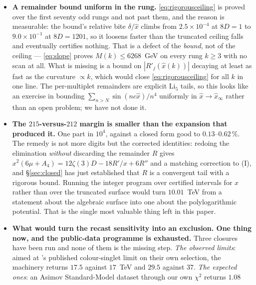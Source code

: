 \documentclass[11pt,a4paper]{article}
\newcommand{\amin}{\alpha_{\min}}
\begin{document}
\begin{itemize}
question: across $6560$ contents the $2956$ interior minimisers stand only $1.05$ times closer to
the rational skeleton $\{1/3,1/2,2/3\}$ than chance does. The $y$ at which a given content's third
minimum sits still ought to be readable off its charges the way $\amin$ is, and is not --- and the
nearest rational holonomy is now known not to be the way to read it.
\item \textbf{A remainder bound uniform in the rung.} \eqref{eq:rigorousceiling} is proved over the
first seventy odd rungs and not past them, and the reason is measurable: the bound's relative bite
$\delta/\hat x$ climbs from $2.5\times10^{-4}$ at $8D=1$ to $9.0\times10^{-1}$ at $8D=1201$, so it
loosens faster than the truncated ceiling falls and eventually certifies nothing. That is a defect
of the \emph{bound}, not of the ceiling --- \eqref{eq:slope} proves $M(k)\le6268$~GeV on every rung $k\ge3$
with no scan at all. What is missing is a bound on $|R'_j(\hat x(k))|$ decaying at least as fast as
the curvature $\propto k$, which would close \eqref{eq:rigorousceiling} for all $k$ in one line. The
per-multiplet remainders are explicit Li$_5$ tails, so this looks like an exercise in bounding
$\sum_{n>N}\sin(nc\hat x)/n^4$ uniformly in $\hat x\to\hat x_\infty$ rather than an open problem;
we have not done it.
\item \textbf{The $215$-versus-$212$ margin is smaller than the expansion that produced it.} One
part in $10^{4}$, against a closed form good to $0.13$--$0.62\,\%$. The remedy is not more digits
but the corrected identities: redoing the elimination \emph{without} discarding the remainder
$R$ gives $x^2(6\mu+A_4)=12\zeta(3)D-18R'/x+6R''$ and a matching correction to (I), and
\S\ref{sec:closed} has just established that $R$ is a convergent tail with a rigorous bound. Running
the integer program over certified intervals for $x$ rather than over the truncated surface would
turn $10.01$~TeV from a statement about the algebraic surface into one about the polylogarithmic
potential. That is the single most valuable thing left in this paper.
\item \textbf{What would turn the recast sensitivity into an exclusion. One thing now, and the
public-data programme is exhausted.} Three closures have been run and none of them is the missing
step. \emph{The observed limits}: aimed at \cite{CMSangular}'s published colour-singlet limit on
their own selection, the machinery returns $17.5$ against $17$~TeV and $29.5$ against $37$.
\emph{The expected ones}: an Asimov Standard-Model dataset through our own $\chi^2$ returns $1.08$

\end{itemize}
\end{document}
